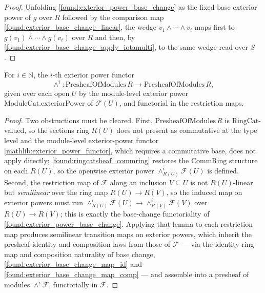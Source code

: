 \begin{proof}
  \leanok
  Unfolding \cref{found:exterior_power_base_change} as the fixed-base exterior
  power of \(g\) over \(R\) followed by the comparison map
  \cref{found:exterior_base_change_linear}, the wedge \(v_1\wedge\cdots\wedge v_i\)
  maps first to \(g(v_1)\wedge\cdots\wedge g(v_i)\) over \(R\) and then, by
  \cref{found:exterior_base_change_apply_iotamulti}, to the same wedge read over
  \(S\).
\end{proof}

\begin{lemma}\leanok
  \label{found:presheafmod_exterior_power}
  For \(i\in\mathbb N\), the \(i\)-th exterior power functor
  \[
    \wedge^i:\mathrm{PresheafOfModules}\,R\to\mathrm{PresheafOfModules}\,R ,
  \]
  given over each open \(U\) by the module-level exterior power
  \(\mathrm{ModuleCat.exteriorPower}\) of \(\mathcal F(U)\), and functorial in the
  restriction maps.
\end{lemma}

\begin{proof}\leanok
  Two obstructions must be cleared.  First, \(\mathrm{PresheafOfModules}\,R\) is
  \(\mathrm{RingCat}\)-valued, so the sections ring \(R(U)\) does not present as
  commutative at the type level and the module-level exterior-power functor
  \cref{mathlib:exterior_power_functor}, which requires a commutative base, does
  not apply directly; \cref{found:ringcatsheaf_commring} restores the
  \(\mathrm{CommRing}\) structure on each \(R(U)\), so the openwise exterior power
  \(\wedge^i_{R(U)}\mathcal F(U)\) is defined.  Second, the restriction map of
  \(\mathcal F\) along an inclusion \(V\subseteq U\) is not \(R(U)\)-linear but
  \emph{semilinear} over the ring map \(R(U)\to R(V)\), so the induced map on
  exterior powers must run \(\wedge^i_{R(U)}\mathcal F(U)\to\wedge^i_{R(V)}\mathcal
  F(V)\) over \(R(U)\to R(V)\); this is exactly the base-change functoriality of
  \cref{found:exterior_power_base_change}.  Applying that lemma to each
  restriction map produces semilinear transition maps on exterior powers, which
  inherit the presheaf identity and composition laws from those of
  \(\mathcal F\) --- via the identity-ring-map and composition naturality of base
  change, \cref{found:exterior_base_change_map_id} and
  \cref{found:exterior_base_change_map_comp} --- and assemble into a presheaf of
  modules \(\wedge^i\mathcal F\), functorially in \(\mathcal F\).
\end{proof}

